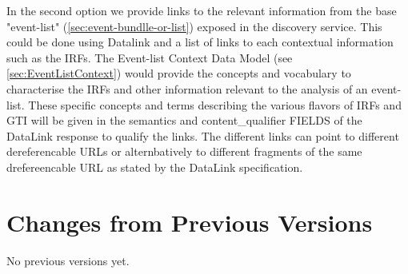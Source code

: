 \documentclass[11pt,a4paper]{ivoa}
\begin{document}
In the second option we provide links to the relevant information from the base "event-list" (\ref{sec:event-bundlle-or-list}) exposed in the discovery service. This could be done using Datalink and a list of links to each contextual information such as the IRFs. The Event-list Context Data Model (see \ref{sec:EventListContext}) would provide the concepts and vocabulary to characterise the IRFs and other information relevant to the analysis of an event-list. These specific concepts and terms describing the various flavors of IRFs and GTI will be given in the semantics and content\_qualifier FIELDS of the DataLink response to qualify the links. The different links can point to different
dereferencable URLs or alternbatively to different fragments of the same drefereencable URL as stated by the DataLink specification.






%

\appendix

\section{Changes from Previous Versions}

No previous versions yet.


\end{document}
